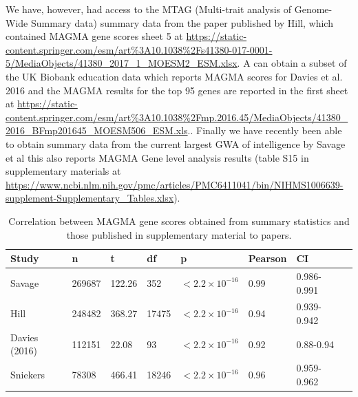 We have, however, had access to the MTAG (Multi-trait analysis of Genome-Wide Summary data) summary data from the paper published by Hill, which contained MAGMA gene scores sheet 5 at \url{https://static-content.springer.com/esm/art\%3A10.1038\%2Fs41380-017-0001-5/MediaObjects/41380_2017_1_MOESM2_ESM.xlsx}\cite{hill2019combined}. A
can obtain a subset of the UK Biobank education data which reports MAGMA scores for Davies et al. 2016 \cite{davies2016genome} and the MAGMA results for the top 95 genes are reported in the first sheet at  \url{https://static-content.springer.com/esm/art\%3A10.1038\%2Fmp.2016.45/MediaObjects/41380_2016_BFmp201645_MOESM506_ESM.xls}.. Finally we have recently been able to obtain summary data from the current largest GWA of intelligence by Savage et al \cite{savage2018genome} this also reports MAGMA Gene level analysis results (table S15 in supplementary materials at \url{https://www.ncbi.nlm.nih.gov/pmc/articles/PMC6411041/bin/NIHMS1006639-supplement-Supplementary_Tables.xlsx}).

\begin{table}[ht]
    \centering
    
    \begin{tabular}{llllllll}
    \toprule
        Study & n & t & df & p & Pearson & CI   \\
        \midrule
       Savage \cite{savage2018genome} & 269687 & 122.26& 352  & $<2.2 \times 10^{-16}$ & 0.99 & 0.986-0.991  \\ 
       Hill \cite{hill2019combined} & 248482 & 368.27 & 17475 & $<2.2 \times 10^{-16}$& 0.94 & 0.939-0.942 \\
       Davies (2016) \cite{davies2016genome} & 112151 & 22.08 & 93 & $<2.2 \times 10^{-16}$ & 0.92 & 0.88-0.94\\
       Sniekers \cite{sniekers2017genome}& 78308 & 466.41 & 18246 & $<2.2 \times 10^{-16}$ & 0.96 & 0.959-0.962\\
       \bottomrule
    \end{tabular}
    \caption{Correlation between MAGMA gene scores obtained from summary statistics and those published in supplementary material to papers.}
    \label{tab:Correlation between MAGMA gene scores obtained from summary statistics and those published in supplementary material to papers}
\end{table}



